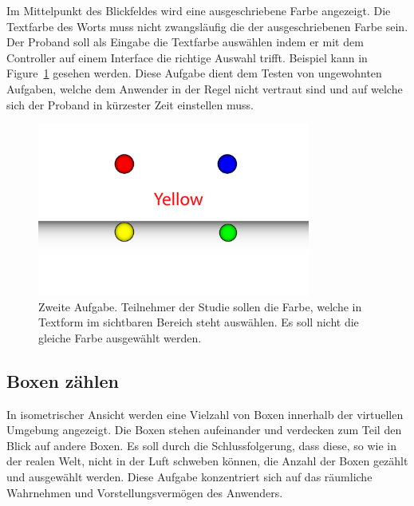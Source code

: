 Im Mittelpunkt des Blickfeldes wird eine ausgeschriebene Farbe angezeigt. Die Textfarbe des Worts muss nicht zwangsläufig die der ausgeschriebenen Farbe sein. Der Proband soll als Eingabe die Textfarbe auswählen indem er mit dem Controller auf einem Interface die richtige Auswahl trifft. Beispiel kann in Figure~\ref{fig:matching_abstract} gesehen werden. Diese Aufgabe dient dem Testen von ungewohnten Aufgaben, welche dem Anwender in der Regel nicht vertraut sind und auf welche sich der Proband in kürzester Zeit einstellen muss.

\begin{figure}[H]
	\centering
	\includegraphics[width=0.8\textwidth]{./images/matching_abstract.png}
	\caption{Zweite Aufgabe. Teilnehmer der Studie sollen die Farbe, welche in Textform im sichtbaren Bereich steht auswählen. Es soll nicht die gleiche Farbe ausgewählt werden.}
	\label{fig:matching_abstract}
\end{figure}

\subsection{Boxen zählen} 

In isometrischer Ansicht werden eine Vielzahl von Boxen innerhalb der virtuellen Umgebung angezeigt. Die Boxen stehen aufeinander und verdecken zum Teil den Blick auf andere Boxen. Es soll durch die Schlussfolgerung, dass diese, so wie in der realen Welt, nicht in der Luft schweben können, die Anzahl der Boxen gezählt und ausgewählt werden. Diese Aufgabe konzentriert sich auf das räumliche Wahrnehmen und Vorstellungsvermögen des Anwenders.

